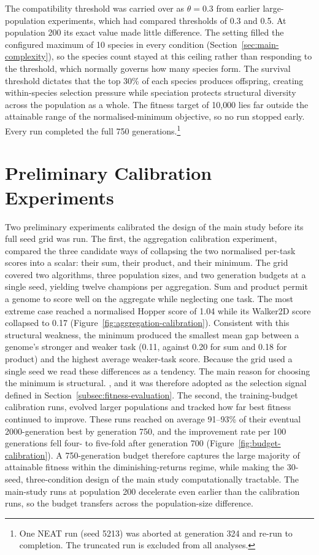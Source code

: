 The compatibility threshold was carried over as $\theta = 0.3$ from earlier large-population experiments, which had compared thresholds of 0.3 and 0.5.
At population 200 its exact value made little difference. The setting filled the configured maximum of 10 species in every condition (Section~\ref{sec:main-complexity}), so the species count stayed at this ceiling rather than responding to the threshold, which normally governs how many species form.
The survival threshold dictates that the top 30\% of each species produces offspring, creating within-species selection pressure while speciation protects structural diversity across the population as a whole.
The fitness target of 10{,}000 lies far outside the attainable range of the normalised-minimum objective, so no run stopped early. Every run completed the full 750 generations.\footnote{One NEAT run (seed 5213) was aborted at generation 324 and re-run to completion. The truncated run is excluded from all analyses.}

\section{Preliminary Calibration Experiments}
\label{subsec:calibration}

Two preliminary experiments calibrated the design of the main study before its full seed grid was run.
The first, the aggregation calibration experiment, compared the three candidate ways of collapsing the two normalised per-task scores into a scalar: their sum, their product, and their minimum.
The grid covered two algorithms, three population sizes, and two generation budgets at a single seed, yielding twelve champions per aggregation.
Sum and product permit a genome to score well on the aggregate while neglecting one task. The most extreme case reached a normalised Hopper score of 1.04 while its Walker2D score collapsed to 0.17 (Figure~\ref{fig:aggregation-calibration}).
Consistent with this structural weakness, the minimum produced the smallest mean gap between a genome's stronger and weaker task (0.11, against 0.20 for sum and 0.18 for product) and the highest average weaker-task score.
Because the grid used a single seed we read these differences as a tendency. The main reason for choosing the minimum is structural.
, and it was therefore adopted as the selection signal defined in Section~\ref{subsec:fitness-evaluation}.
The second, the training-budget calibration runs, evolved larger populations  and tracked how far best fitness continued to improve.
These runs reached on average 91--93\% of their eventual 2000-generation best by generation 750, and the improvement rate per 100 generations fell four- to five-fold after generation 700 (Figure~\ref{fig:budget-calibration}).
A 750-generation budget therefore captures the large majority of attainable fitness within the diminishing-returns regime, while making the 30-seed, three-condition design of the main study computationally tractable.
The main-study runs at population 200 decelerate even earlier than the calibration runs, so the budget transfers across the population-size difference.

